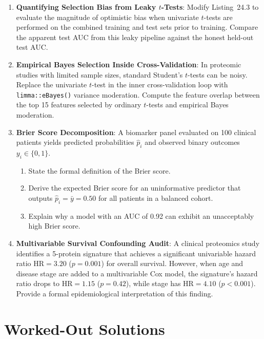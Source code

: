 \documentclass[11pt,twoside,openright]{book}
\begin{document}
\begin{enumerate}
    \item \textbf{Quantifying Selection Bias from Leaky $t$-Tests}: Modify Listing~24.3 to evaluate the magnitude of optimistic bias when univariate $t$-tests are performed on the combined training and test sets prior to training. Compare the apparent test AUC from this leaky pipeline against the honest held-out test AUC.
    \item \textbf{Empirical Bayes Selection Inside Cross-Validation}: In proteomic studies with limited sample sizes, standard Student's $t$-tests can be noisy. Replace the univariate $t$-test in the inner cross-validation loop with \texttt{limma::eBayes()} variance moderation. Compute the feature overlap between the top 15 features selected by ordinary $t$-tests and empirical Bayes moderation.
    \item \textbf{Brier Score Decomposition}: A biomarker panel evaluated on 100 clinical patients yields predicted probabilities $\hat{p}_i$ and observed binary outcomes $y_i \in \{0, 1\}$. 
    \begin{enumerate}
        \item State the formal definition of the Brier score.
        \item Derive the expected Brier score for an uninformative predictor that outputs $\hat{p}_i = \bar{y} = 0.50$ for all patients in a balanced cohort.
        \item Explain why a model with an AUC of 0.92 can exhibit an unacceptably high Brier score.
    \end{enumerate}
    \item \textbf{Multivariable Survival Confounding Audit}: A clinical proteomics study identifies a 5-protein signature that achieves a significant univariable hazard ratio $\text{HR} = 3.20$ ($p = 0.001$) for overall survival. However, when age and disease stage are added to a multivariable Cox model, the signature's hazard ratio drops to $\text{HR} = 1.15$ ($p = 0.42$), while stage has $\text{HR} = 4.10$ ($p < 0.001$). Provide a formal epidemiological interpretation of this finding.
\end{enumerate}

\section{Worked-Out Solutions}
\end{document}
